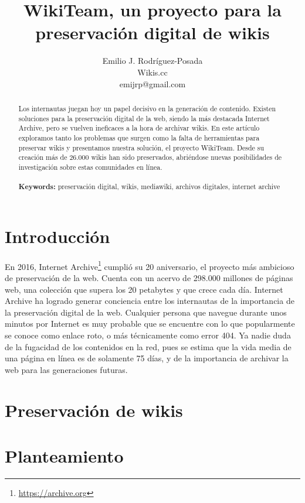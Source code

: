 \documentclass[14pt,twocolumn]{article}
\title{WikiTeam, un proyecto para la preservación digital de wikis}
\author{Emilio J. Rodríguez-Posada \\ Wikis.cc \\ emijrp@gmail.com}
\begin{document}
	
\maketitle

\begin{abstract}

Los internautas juegan hoy un papel decisivo en la generación de contenido. Existen soluciones para la preservación digital de la web, siendo la más destacada Internet Archive, pero se vuelven ineficaces a la hora de archivar wikis. En este artículo exploramos tanto los problemas que surgen como la falta de herramientas para preservar wikis y presentamos nuestra solución, el proyecto WikiTeam. Desde su creación más de 26.000 wikis han sido preservados, abriéndose nuevas posibilidades de investigación sobre estas comunidades en línea.
\\
\\
\textbf{Keywords:} preservación digital, wikis, mediawiki, archivos digitales, internet archive

\end{abstract}

\section{Introducción}

En 2016, Internet Archive\footnote{\href{http://archive.org}{https://archive.org}} cumplió su 20 aniversario, el proyecto más ambicioso de preservación de la web. Cuenta con un acervo de 298.000 millones de páginas web, una colección que supera los 20 petabytes y que crece cada día. Internet Archive ha logrado generar conciencia entre los internautas de la importancia de la preservación digital de la web. Cualquier persona que navegue durante unos minutos por Internet es muy probable que se encuentre con lo que popularmente se conoce como enlace roto, o más técnicamente como error 404. Ya nadie duda de la fugacidad de los contenidos en la red, pues se estima que la vida media de una página en línea es de solamente 75 días,\cite{lawrence2001} y de la importancia de archivar la web para las generaciones futuras.

\section{Preservación de wikis}

\section{Planteamiento}
\end{document}
